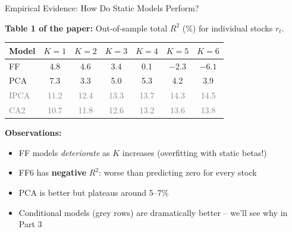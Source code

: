 \documentclass[aspectratio=169]{beamer}
\begin{document}
\begin{frame}{Empirical Evidence: How Do Static Models Perform?}

\textbf{Table 1 of the paper:} Out-of-sample total $R^2$ (\%) for individual stocks $r_t$.

\vspace{0.5em}
\begin{center}
\renewcommand{\arraystretch}{1.2}
\begin{tabular}{lcccccc}
\toprule
\textbf{Model} & $K=1$ & $K=2$ & $K=3$ & $K=4$ & $K=5$ & $K=6$ \\
\midrule
FF & 4.8 & 4.6 & 3.4 & 0.1 & $-2.3$ & $-6.1$ \\
PCA & 7.3 & 3.3 & 5.0 & 5.3 & 4.2 & 3.9 \\
\midrule
\textcolor{gray}{IPCA} & \textcolor{gray}{11.2} & \textcolor{gray}{12.4} & \textcolor{gray}{13.3} & \textcolor{gray}{13.7} & \textcolor{gray}{14.3} & \textcolor{gray}{14.5} \\
\textcolor{gray}{CA2} & \textcolor{gray}{10.7} & \textcolor{gray}{11.8} & \textcolor{gray}{12.6} & \textcolor{gray}{13.2} & \textcolor{gray}{13.6} & \textcolor{gray}{13.8} \\
\bottomrule
\end{tabular}
\end{center}

\vspace{0.3em}
\textbf{Observations:}
\begin{itemize}
    \item FF models \emph{deteriorate} as $K$ increases (overfitting with static betas!)
    \item FF6 has \textbf{negative} $R^2$: worse than predicting zero for every stock
    \item PCA is better but plateaus around 5--7\%
    \item Conditional models (grey rows) are dramatically better -- we'll see why in Part 3
\end{itemize}
\end{frame}
%
%
\end{document}
